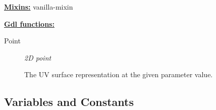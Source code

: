 \documentclass [11pt]{book}
\begin{document}
\begin{itemize}
\textbf{
\underline{Mixins:}} vanilla-mixin






\textbf{
\underline{Gdl functions:}}

\begin{description}

\item [Point]
\emph{2D point}

 The UV surface representation at the given parameter value.




\end{description}







\end{itemize}



\subsection{Variables and Constants}

\label{subsec:variablesandconstants}
\end{document}
